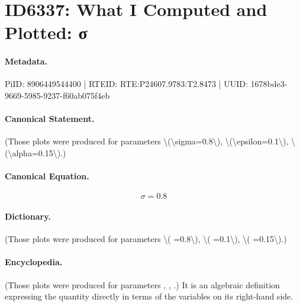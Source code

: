 \section*{ID6337: What I Computed and Plotted: σ}
\paragraph{Metadata.}
PiID: 8906449544400 | RTEID: RTE:P24607.9783:T2.8473 | UUID: 1678bde3-9669-5985-9237-f60ab075f4eb

\paragraph{Canonical Statement.}
(Those plots were produced for parameters \textbackslash{}(\textbackslash{}sigma=0.8\textbackslash{}), \textbackslash{}(\textbackslash{}epsilon=0.1\textbackslash{}), \textbackslash{}(\textbackslash{}alpha=0.15\textbackslash{}).)

\paragraph{Canonical Equation.}
\[
\sigma=0.8
\]

\paragraph{Dictionary.}
(Those plots were produced for parameters \textbackslash{}( =0.8\textbackslash{}), \textbackslash{}( =0.1\textbackslash{}), \textbackslash{}( =0.15\textbackslash{}).)

\paragraph{Encyclopedia.}
(Those plots were produced for parameters , , .) It is an algebraic definition expressing the quantity directly in terms of the variables on its right-hand side.

